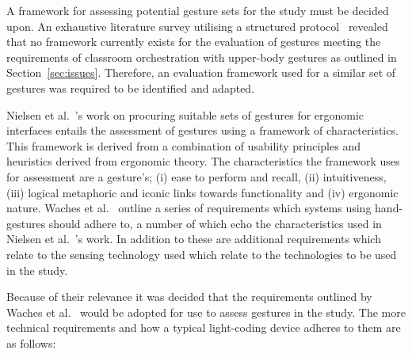 \documentclass[link]{IWCOMP}
\begin{document}
A framework for assessing potential gesture sets for the study must be decided upon.
An exhaustive literature survey utilising a structured protocol~\cite{kitchenham04} revealed that no framework currently exists for the evaluation of gestures meeting the requirements of classroom orchestration with upper-body gestures as outlined in Section~\ref{sec:issues}.
Therefore, an evaluation framework used for a similar set of gestures was required to be identified and adapted.

Nielsen et al.~\citeyearpar{Nielsen2004}'s work on procuring suitable sets of gestures for ergonomic interfaces entails the assessment of gestures using a framework of characteristics.
This framework is derived from a combination of usability principles and heuristics derived from ergonomic theory.
The characteristics the framework uses for assessment are a gesture's; (i) ease to perform and recall, (ii) intuitiveness, (iii) logical metaphoric and iconic links towards functionality and (iv) ergonomic nature.
Waches et al.~\citeyearpar{Wachs2011} outline a series of requirements which systems using hand-gestures should adhere to, a number of which echo the characteristics used in Nielsen et al.~\citeyearpar{Nielsen2004}'s work.
In addition to these are additional requirements which relate to the sensing technology used which relate to the technologies to be used in the study.

Because of their relevance it was decided that the requirements outlined by Waches et al.~\citeyearpar{Wachs2011} would be adopted for use to assess gestures in the study.
The more technical requirements and how a typical light-coding device adheres to them are as follows:
\end{document}
